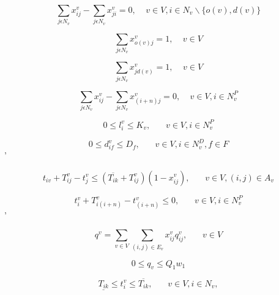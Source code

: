 \documentclass[a4paper,12pt]{article}
\begin{document}
\begin{equation} \label{eq:3}
\sum_{j\epsilon N_v}x_{ij}^v - \sum_{j\epsilon N_v} x_{ji}^v = 0, ~~~~~ v \in V, i\in N_v \backslash \{o(v), d(v)\} 
\end{equation}

\begin{equation} \label{eq:4}
\sum_{j\epsilon N_v} x_{o(v)j}^v = 1, ~~~~~ v \in V
\end{equation}

\begin{equation} \label{eq:5}
\sum_{j\epsilon N_v} x_{j d(v)}^v = 1, ~~~~~ v \in V
\end{equation}

\begin{equation} \label{eq:6}
\sum_{j\epsilon N_v}x_{ij}^v - \sum_{j\epsilon N_v} x_{(i+n)j}^v = 0, ~~~~~ v \in V, i\in N^P_v
\end{equation}

\begin{equation} \label{eq:7}
0 \leq l_{i}^v \leq K_v, ~~~~~~~~ v \in V, i \in N^P_v
\end{equation}

\begin{equation} \label{eq:8}
0 \leq d_{if}^v \leq D_f, ~~~~~~~~ v \in V, i \in N^D_v, f \in F
\end{equation}'

\begin{equation} \label{eq:9}
t_{iv} + T_{ij}^v - t_{j}^v \leq (\overline{T_{ik}} + T_{ij}^v)(1 - x_{ij}^v), ~~~~~~~~ v \in V, (i,j) \in A_v
\end{equation}

\begin{equation} \label{eq:10}
    t_{i}^v + T_{i(i+n)}^v - t_{(i+n)}^v \leq 0, ~~~~~~~~ v \in V, i \in N^P_v
\end{equation}'

\begin{equation} \label{eq:11}
    q^v = \sum_{v \in V} \sum_{(i,j) \in E_v} x_{ij}^vq_{ij}^v,~~~~~~~~ v \in V
\end{equation}

\begin{equation} \label{eq:12}
    0 \leq q_v \leq Q_1w_1
\end{equation}

\begin{equation} \label{eq:13}
  \underline{T_{ik}} \leq t_{i}^v \leq  \overline{T_{ik}}, ~~~~~~~~ v \in V, i \in N_v,
\end{equation}
\end{document}

